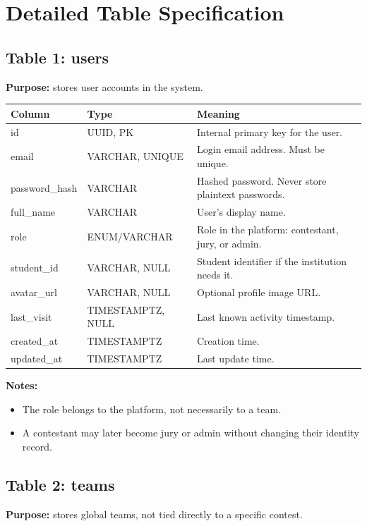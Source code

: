 \documentclass[11pt,a4paper]{article}
\begin{document}
\section{Detailed Table Specification}

\subsection{Table 1: users}
\textbf{Purpose:} stores user accounts in the system.

\begin{longtable}{>{\raggedright\arraybackslash}p{} >{\raggedright\arraybackslash}p{} >{\raggedright\arraybackslash}p{}}
\toprule
\textbf{Column} & \textbf{Type} & \textbf{Meaning} \\
\midrule
id & UUID, PK & Internal primary key for the user. \\
email & VARCHAR, UNIQUE & Login email address. Must be unique. \\
password\_hash & VARCHAR & Hashed password. Never store plaintext passwords. \\
full\_name & VARCHAR & User's display name. \\
role & ENUM/VARCHAR & Role in the platform: contestant, jury, or admin. \\
student\_id & VARCHAR, NULL & Student identifier if the institution needs it. \\
avatar\_url & VARCHAR, NULL & Optional profile image URL. \\
last\_visit & TIMESTAMPTZ, NULL & Last known activity timestamp. \\
created\_at & TIMESTAMPTZ & Creation time. \\
updated\_at & TIMESTAMPTZ & Last update time. \\
\bottomrule
\end{longtable}

\textbf{Notes:}
\begin{itemize}
    \item The role belongs to the platform, not necessarily to a team.
    \item A contestant may later become jury or admin without changing their identity record.
\end{itemize}

\subsection{Table 2: teams}
\textbf{Purpose:} stores global teams, not tied directly to a specific contest.
\end{document}
